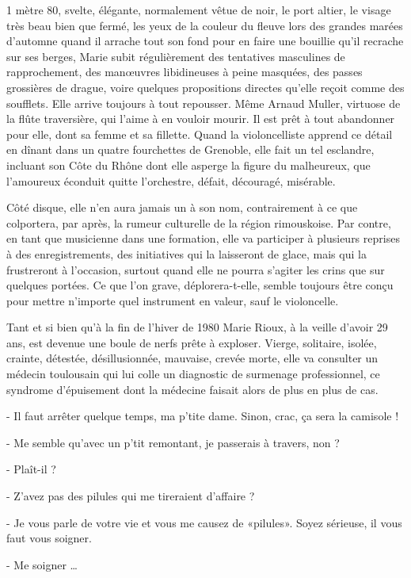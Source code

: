 1 mètre 80, svelte, élégante, normalement vêtue de noir, le port altier, le visage très beau bien que fermé, les yeux de la couleur du fleuve lors des grandes marées d’automne quand il arrache tout son fond pour en faire une bouillie qu’il recrache sur ses berges, Marie subit régulièrement des tentatives masculines de rapprochement, des manœuvres libidineuses à peine masquées, des passes grossières de drague, voire quelques propositions directes qu’elle reçoit comme des soufflets. Elle arrive toujours à tout repousser. Même Arnaud Muller, virtuose de la flûte traversière, qui l’aime à en vouloir mourir. Il est prêt à tout abandonner pour elle, dont sa femme et sa fillette. Quand la violoncelliste apprend ce détail en dînant dans un quatre fourchettes de Grenoble, elle fait un tel esclandre, incluant son Côte du Rhône dont elle asperge la figure du malheureux, que l’amoureux éconduit quitte l’orchestre, défait, découragé, misérable.

Côté disque, elle n’en aura jamais un à son nom, contrairement à ce que colportera, par après, la rumeur culturelle de la région rimouskoise. Par contre, en tant que musicienne dans une formation, elle va participer à plusieurs reprises à des enregistrements, des initiatives qui la laisseront de glace, mais qui la frustreront à l’occasion, surtout quand elle ne pourra s’agiter les crins que sur quelques portées. Ce que l’on grave, déplorera-t-elle, semble toujours être conçu pour mettre n’importe quel instrument en valeur, sauf le violoncelle.

Tant et si bien qu’à la fin de l’hiver de 1980 Marie Rioux, à la veille d’avoir 29 ans, est devenue une boule de nerfs prête à exploser. Vierge, solitaire, isolée, crainte, détestée, désillusionnée, mauvaise, crevée morte, elle va consulter un médecin toulousain qui lui colle un diagnostic de surmenage professionnel, ce syndrome d’épuisement dont la médecine faisait alors de plus en plus de cas.

- Il faut arrêter quelque temps, ma p’tite dame. Sinon, crac, ça sera la camisole !

- Me semble qu’avec un p’tit remontant, je passerais à travers, non ?

- Plaît-il ?

- Z’avez pas des pilules qui me tireraient d’affaire ?

- Je vous parle de votre vie et vous me causez de «pilules». Soyez sérieuse, il vous faut vous soigner.

- Me soigner …

